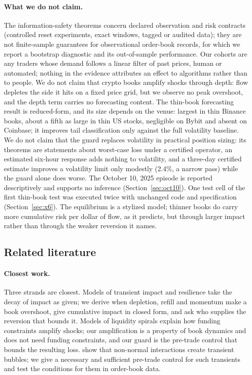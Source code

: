 \documentclass[12pt]{article}
\theoremstyle{definition}
\theoremstyle{remark}
\begin{document}
\paragraph{What we do not claim.} The information-safety theorems concern declared observation and risk contracts (controlled reset experiments, exact windows, tagged or audited data); they are not finite-sample guarantees for observational order-book records, for which we report a bootstrap diagnostic and its out-of-sample performance. Our cohorts are any traders whose demand follows a linear filter of past prices, human or automated; nothing in the evidence attributes an effect to algorithms rather than to people. We do not claim that crypto books amplify shocks through depth: flow depletes the side it hits on a fixed price grid, but we observe no peak overshoot, and the depth term carries no forecasting content. The thin-book forecasting result is reduced-form, and its size depends on the venue: largest in thin Binance books, about a fifth as large in thin US stocks, negligible on Bybit and absent on Coinbase; it improves tail classification only against the full volatility baseline. We do not claim that the guard replaces volatility in practical position sizing: its theorems are statements about worst-case loss under a certified operator, an estimated six-hour response adds nothing to volatility, and a three-day certified estimate improves a volatility limit only modestly (2.4\%, a narrow pass) while the guard alone does worse. The October 10, 2025 episode is reported descriptively and supports no inference (Section~\ref{sec:oct10}). One test cell of the first thin-book test was executed twice with unchanged code and specification (Section~\ref{sec:x6}). The equilibrium is a stylized model; thinner books do carry more cumulative risk per dollar of flow, as it predicts, but through larger impact rather than through the weaker reversion it names.



\subsection{Related literature}

\paragraph{Closest work.} Three strands are closest. Models of transient impact and resilience \citep{obizhaeva2013,bouchaud2004,bouchaud2018} take the decay of impact as given; we derive when depletion, refill and momentum make a book overshoot, give cumulative impact in closed form, and ask who supplies the reversion that bounds it. Models of liquidity spirals \citep{brunnermeier2009,shleifer1992} explain how funding constraints amplify shocks; our amplification is a property of book dynamics and does not need funding constraints, and our guard is the pre-trade control that bounds the resulting loss. \citet{sornette2023} show that non-normal interactions create transient bubbles; we give a necessary and sufficient pre-trade control for such transients and test the conditions for them in order-book data.
\end{document}
